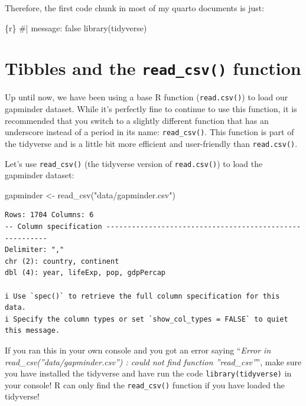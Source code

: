 \documentclass[
  letterpaper,
  DIV=11,
  numbers=noendperiod]{scrreprt}
\newenvironment{Shaded}{\begin{snugshade}}{\end{snugshade}}
\newcommand{\FunctionTok}[1]{\textcolor[rgb]{0.28,0.35,0.67}{#1}}
\newcommand{\InformationTok}[1]{\textcolor[rgb]{0.37,0.37,0.37}{#1}}
\newcommand{\NormalTok}[1]{\textcolor[rgb]{0.00,0.23,0.31}{#1}}
\newcommand{\OtherTok}[1]{\textcolor[rgb]{0.00,0.23,0.31}{#1}}
\newcommand{\StringTok}[1]{\textcolor[rgb]{0.13,0.47,0.30}{#1}}
\begin{document}
Therefore, the first code chunk in most of my quarto documents is just:

\begin{Shaded}
\begin{Highlighting}[]
\InformationTok{\textasciigrave{}\textasciigrave{}\textasciigrave{}\{r\}}
\InformationTok{\#| message: false}
\InformationTok{library(tidyverse)}
\InformationTok{\textasciigrave{}\textasciigrave{}\textasciigrave{}}
\end{Highlighting}
\end{Shaded}

\section{\texorpdfstring{Tibbles and the \texttt{read\_csv()}
function}{Tibbles and the read\_csv() function}}\label{tibbles-and-the-read_csv-function}

Up until now, we have been using a base R function (\texttt{read.csv()})
to load our gapminder dataset. While it's perfectly fine to continue to
use this function, it is recommended that you switch to a slightly
different function that has an underscore instead of a period in its
name: \texttt{read\_csv()}. This function is part of the tidyverse and
is a little bit more efficient and user-friendly than
\texttt{read.csv()}.

Let's use \texttt{read\_csv()} (the tidyverse version of
\texttt{read.csv()}) to load the gapminder dataset:

\begin{Shaded}
\begin{Highlighting}[]
\NormalTok{gapminder }\OtherTok{\textless{}{-}} \FunctionTok{read\_csv}\NormalTok{(}\StringTok{"data/gapminder.csv"}\NormalTok{)}
\end{Highlighting}
\end{Shaded}

\begin{verbatim}
Rows: 1704 Columns: 6
-- Column specification --------------------------------------------------------
Delimiter: ","
chr (2): country, continent
dbl (4): year, lifeExp, pop, gdpPercap

i Use `spec()` to retrieve the full column specification for this data.
i Specify the column types or set `show_col_types = FALSE` to quiet this message.
\end{verbatim}

If you ran this in your own console and you got an error saying
``\emph{Error in read\_csv(''data/gapminder.csv'') : could not find
function ''read\_csv''}'', make sure you have installed the tidyverse
and have run the code \texttt{library(tidyverse)} in your console! R can
only find the \texttt{read\_csv()} function if you have loaded the
tidyverse!
\end{document}
